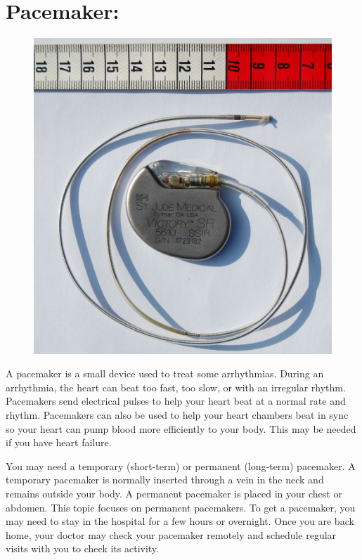 \documentclass[a4paper,12pt]{article}
\begin{document}
 
\section{Pacemaker:}

\begin{figure}[h]
\includegraphics[scale=0.4]{pac.jpg}
\end{figure}
\medspace
 
 A pacemaker is a small device used to treat some arrhythmias. During an arrhythmia, the heart can beat too fast, too slow, or with an irregular rhythm. Pacemakers send electrical pulses to help your heart beat at a normal rate and rhythm. Pacemakers can also be used to help your heart chambers beat in sync so your heart can pump blood more efficiently to your body. This may be needed if you have heart failure.
 
 You may need a temporary (short-term) or permanent (long-term) pacemaker. A temporary pacemaker is normally inserted through a vein in the neck and remains outside your body. A permanent pacemaker is placed in your chest or abdomen. This topic focuses on permanent pacemakers.
  To get a pacemaker, you may need to stay in the hospital for a few hours or overnight. Once you are back home, your doctor may check your pacemaker remotely and schedule regular visits with you to check its activity.
 
\end{document}

